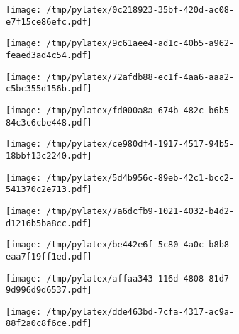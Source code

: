 \documentclass{article}
\begin{document}
\begin{figure}[htbp]
\begin{subfigure}[b]{.3\linewidth}
\texttt{[image: /tmp/pylatex/0c218923-35bf-420d-ac08-e7f15ce86efc.pdf]}
\end{subfigure}
\begin{subfigure}[b]{.3\linewidth}
\texttt{[image: /tmp/pylatex/9c61aee4-ad1c-40b5-a962-feaed3ad4c54.pdf]}
\end{subfigure}
\begin{subfigure}[b]{.3\linewidth}
\texttt{[image: /tmp/pylatex/72afdb88-ec1f-4aa6-aaa2-c5bc355d156b.pdf]}
\end{subfigure}
\begin{subfigure}[b]{.3\linewidth}
\texttt{[image: /tmp/pylatex/fd000a8a-674b-482c-b6b5-84c3c6cbe448.pdf]}
\end{subfigure}
\begin{subfigure}[b]{.3\linewidth}
\texttt{[image: /tmp/pylatex/ce980df4-1917-4517-94b5-18bbf13c2240.pdf]}
\end{subfigure}
\begin{subfigure}[b]{.3\linewidth}
\texttt{[image: /tmp/pylatex/5d4b956c-89eb-42c1-bcc2-541370c2e713.pdf]}
\end{subfigure}
\begin{subfigure}[b]{.3\linewidth}
\texttt{[image: /tmp/pylatex/7a6dcfb9-1021-4032-b4d2-d1216b5ba8cc.pdf]}
\end{subfigure}
\begin{subfigure}[b]{.3\linewidth}
\texttt{[image: /tmp/pylatex/be442e6f-5c80-4a0c-b8b8-eaa7f19ff1ed.pdf]}
\end{subfigure}
\begin{subfigure}[b]{.3\linewidth}
\texttt{[image: /tmp/pylatex/affaa343-116d-4808-81d7-9d996d9d6537.pdf]}
\end{subfigure}
\begin{subfigure}[b]{.3\linewidth}
\texttt{[image: /tmp/pylatex/dde463bd-7cfa-4317-ac9a-88f2a0c8f6ce.pdf]}
\end{subfigure}
\end{figure}
\end{document}
